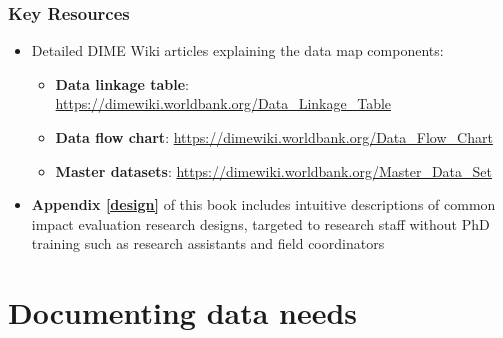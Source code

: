 \documentclass[
]{book}
\providecommand{\tightlist}{%
  \setlength{\itemsep}{0pt}\setlength{\parskip}{0pt}}
\begin{document}
\begin{summary}
\hypertarget{key-resources-2}{%
\subsubsection*{Key Resources}\label{key-resources-2}}

\begin{itemize}
\tightlist
\item
  Detailed DIME Wiki articles explaining the data map components:

  \begin{itemize}
  \tightlist
  \item
    \textbf{Data linkage table}: \url{https://dimewiki.worldbank.org/Data_Linkage_Table}
  \item
    \textbf{Data flow chart}: \url{https://dimewiki.worldbank.org/Data_Flow_Chart}
  \item
    \textbf{Master datasets}: \url{https://dimewiki.worldbank.org/Master_Data_Set}
  \end{itemize}
\item
  \textbf{Appendix \ref{design}} of this book includes intuitive descriptions of common impact evaluation research designs, targeted to research staff without PhD training such as research assistants and field coordinators
\end{itemize}
\end{summary}

\hypertarget{documenting-data-needs}{%
\section*{Documenting data needs}\label{documenting-data-needs}}
\end{document}
